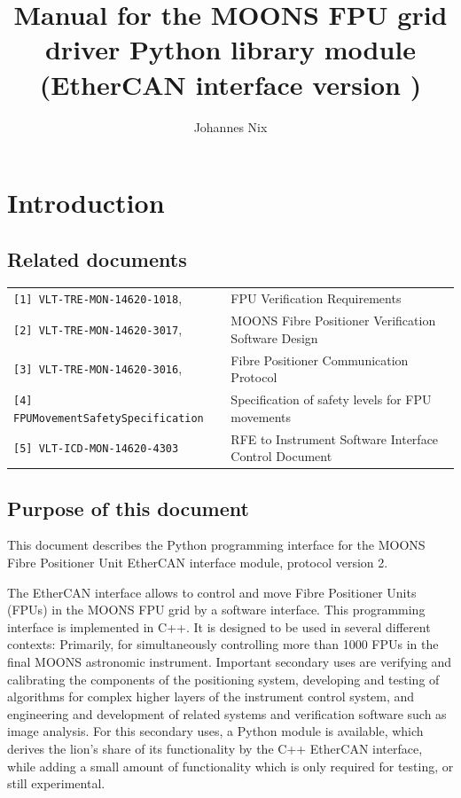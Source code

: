 \documentclass[fontsize=12,a4paper]{scrreprt}
\begin{document}
\title{Manual for the MOONS FPU grid driver Python library
  module\\[3ex] {\LARGE (EtherCAN interface version )} }


\author{Johannes Nix}

\maketitle
{}

\dominitoc



\tableofcontents

\chapter{Introduction}
\section{Related documents}

\begin{tabular}{|ll|}
  \hline
\verb+[1] VLT-TRE-MON-14620-1018+, &  FPU Verification Requirements \\
\verb+[2] VLT-TRE-MON-14620-3017+, & MOONS Fibre Positioner Verification Software Design \\
\verb+[3] VLT-TRE-MON-14620-3016+, & Fibre Positioner Communication Protocol\\
\verb+[4] FPUMovementSafetySpecification+ & Specification of safety levels for FPU movements\\
\verb+[5] VLT-ICD-MON-14620-4303+ & RFE to Instrument Software Interface Control Document \\
\hline
\end{tabular}


\section{Purpose of this document}
This document describes the Python programming interface for the MOONS
Fibre Positioner Unit EtherCAN interface module, protocol version 2.

The EtherCAN interface allows to control and move Fibre Positioner
Units (FPUs) in the MOONS FPU grid by a software interface. This
programming interface is implemented in C++. It is designed to be used
in several different contexts: Primarily, for simultaneously
controlling more than 1000 FPUs in the final MOONS astronomic
instrument. Important secondary uses are verifying and calibrating the
components of the positioning system, developing and testing of
algorithms for complex higher layers of the instrument control system,
and engineering and development of related systems and verification
software such as image analysis. For this secondary uses, a Python
module is available, which derives the lion's share of its
functionality by the C++ EtherCAN interface, while adding a small
amount of functionality which is only required for testing, or still
experimental.
\end{document}
